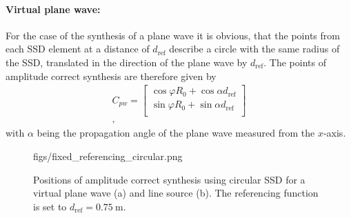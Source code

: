 \documentclass[12pt,a4paper]{article}
\newcommand{\sinfi}{\sin\varphi}
\newcommand{\cosfi}{\cos\varphi}
\newcommand{\dref}{d_{\mathrm{ref}}}
\begin{document}
\paragraph{Virtual plane wave:\\}
For the case of the synthesis of a plane wave it is obvious, that the points from each SSD element at a distance of $\dref$ describe a circle with the same radius of the SSD, translated in the direction of the plane wave by $\dref$. The points of amplitude correct synthesis are therefore given by
\begin{eqnarray}
C_{pw} =  \begin{bmatrix}  \cosfi R_0 + \cos\alpha \dref \\[0.3em] \sinfi R_0 + \sin \alpha \dref \\[0.3em]    \end{bmatrix} \\,
\label{Eq:Fixed_referencing_pw_circle}
\end{eqnarray}
with $\alpha$ being the propagation angle of the plane wave measured from the $x$-axis.

\begin{figure}
	\centering
	\begin{overpic}[width = 1\columnwidth]{figs/fixed_referencing_circular.png}
	\end{overpic}
\caption{ Positions of amplitude correct synthesis using circular SSD for a virtual plane wave (a) and line source (b). The referencing function is set to $\dref = 0.75~\mathrm{m}$. }
	\label{Fig:Theory:fixed_referencing_circular}
\end{figure}
\end{document}
